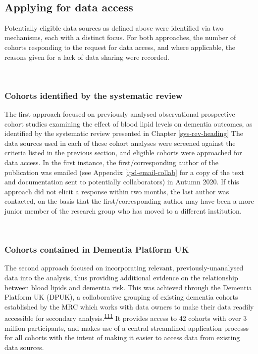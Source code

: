 \documentclass[a4paper, twoside]{templates/ociamthesis}
\begin{document}
~

\hypertarget{applying-for-data-access}{%
\subsection{Applying for data access}\label{applying-for-data-access}}

Potentially eligible data sources as defined above were identified via two mechanisms, each with a distinct focus. For both approaches, the number of cohorts responding to the request for data access, and where applicable, the reasons given for a lack of data sharing were recorded.

~

\hypertarget{cohorts-identified-by-the-systematic-review}{%
\subsubsection{Cohorts identified by the systematic review}\label{cohorts-identified-by-the-systematic-review}}

The first approach focused on previously analysed observational prospective cohort studies examining the effect of blood lipid levels on dementia outcomes, as identified by the systematic review presented in Chapter \ref{sys-rev-heading} The data sources used in each of these cohort analyses were screened against the criteria listed in the previous section, and eligible cohorts were approached for data access. In the first instance, the first/corresponding author of the publication was emailed (see Appendix \ref{ipd-email-collab} for a copy of the text and documentation sent to potentially collaborators) in Autumn 2020. If this approach did not elicit a response within two months, the last author was contacted, on the basis that the first/corresponding author may have been a more junior member of the research group who has moved to a different institution.

~

\hypertarget{cohorts-contained-in-dementia-platform-uk}{%
\subsubsection{Cohorts contained in Dementia Platform UK}\label{cohorts-contained-in-dementia-platform-uk}}

The second approach focused on incorporating relevant, previously-unanalysed data into the analysis, thus providing additional evidence on the relationship between blood lipids and dementia risk. This was achieved through the Dementia Platform UK (DPUK), a collaborative grouping of existing dementia cohorts established by the MRC which works with data owners to make their data readily accessible for secondary analysis.\textsuperscript{\protect\hyperlink{ref-bauermeister2020}{111}} It provides access to 42 cohorts with over 3 million participants, and makes use of a central streamlined application processs for all cohorts with the intent of making it easier to access data from existing data sources.
\end{document}
